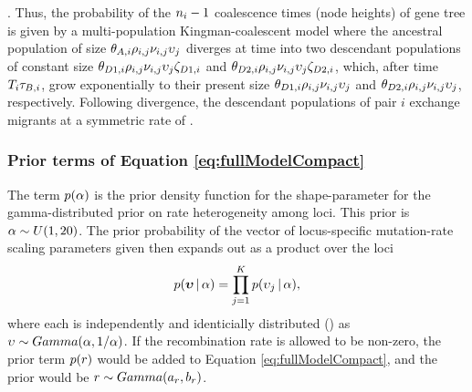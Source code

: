 \documentclass[letterpaper,12pt]{article}
\begin{document}
\begin{linenumbers}
\begin{linenomath}
\migrationRate{}.
Thus, the probability of the $\popSampleSize{i}{}-1$ coalescence times (node
heights) of gene tree  is given by a multi-population
Kingman-coalescent model \citep{Kingman1982} where the ancestral population of
size
$\ancestralTheta{i}\ploidyScalar{i}{j}\mutationRateScalarConstant{i}{j}\locusMutationRateScalar{j}$
diverges at time  into two descendant populations of constant
size
$\descendantTheta{1}{i}\ploidyScalar{i}{j}\mutationRateScalarConstant{i}{j}\locusMutationRateScalar{j}\bottleScalar{1}{i}$
and
$\descendantTheta{2}{i}\ploidyScalar{i}{j}\mutationRateScalarConstant{i}{j}\locusMutationRateScalar{j}\bottleScalar{2}{i}$,
which, after time $\divTimeMap{i}\bottleTime{i}$, grow exponentially to their
present size 
$\descendantTheta{1}{i}\ploidyScalar{i}{j}\mutationRateScalarConstant{i}{j}\locusMutationRateScalar{j}$
and
$\descendantTheta{2}{i}\ploidyScalar{i}{j}\mutationRateScalarConstant{i}{j}\locusMutationRateScalar{j}$,
respectively.
Following divergence, the descendant populations of pair $i$ exchange migrants at a symmetric rate of
.
\end{linenomath}


\subsubsection*{Prior terms of Equation \ref{eq:fullModelCompact}}
\begin{linenomath}
The term $p(\alpha)$ is the prior density
function for the shape-parameter for the gamma-distributed prior on
rate heterogeneity among loci.
This prior is $\alpha \sim U(1, 20)$.
The prior probability of the vector of locus-specific mutation-rate scaling parameters
given \locusRateHetShapeParameter then expands out as a product over
the loci
\begin{equation}
    p(\boldsymbol{\upsilon} \,|\, \alpha) =
    \prod_{j=1}^{K}
    p(\upsilon_{j} \,|\, \alpha),
    \label{eq:locusRateHetPrior}
\end{equation}
where each \locusMutationRateScalar{} is independently and identicially
distributed (\iid) as
$\upsilon_{} \sim Gamma(\alpha,
1/\alpha)$.
If the recombination rate \recombinationRate is allowed to be
non-zero, the prior term $p(r)$ would be added
to Equation \ref{eq:fullModelCompact}, and the prior would be
$r \sim Gamma(a_{r},
b_{r})$.
\end{linenomath}


\end{linenumbers}
\end{document}
